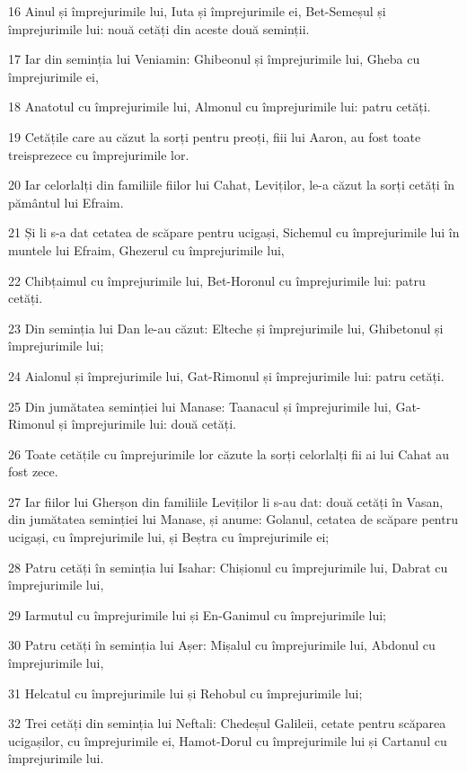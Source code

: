 \par 16 Ainul și împrejurimile lui, Iuta și împrejurimile ei, Bet-Semeșul și împrejurimile lui: nouă cetăți din aceste două seminții.
\par 17 Iar din seminția lui Veniamin: Ghibeonul și împrejurimile lui, Gheba cu împrejurimile ei,
\par 18 Anatotul cu împrejurimile lui, Almonul cu împrejurimile lui: patru cetăți.
\par 19 Cetățile care au căzut la sorți pentru preoți, fiii lui Aaron, au fost toate treisprezece cu împrejurimile lor.
\par 20 Iar celorlalți din familiile fiilor lui Cahat, Leviților, le-a căzut la sorți cetăți în pământul lui Efraim.
\par 21 Și li s-a dat cetatea de scăpare pentru ucigași, Sichemul cu împrejurimile lui în muntele lui Efraim, Ghezerul cu împrejurimile lui,
\par 22 Chibțaimul cu împrejurimile lui, Bet-Horonul cu împrejurimile lui: patru cetăți.
\par 23 Din seminția lui Dan le-au căzut: Elteche și împrejurimile lui, Ghibetonul și împrejurimile lui;
\par 24 Aialonul și împrejurimile lui, Gat-Rimonul și împrejurimile lui: patru cetăți.
\par 25 Din jumătatea seminției lui Manase: Taanacul și împrejurimile lui, Gat-Rimonul și împrejurimile lui: două cetăți.
\par 26 Toate cetățile cu împrejurimile lor căzute la sorți celorlalți fii ai lui Cahat au fost zece.
\par 27 Iar fiilor lui Gherșon din familiile Leviților li s-au dat: două cetăți în Vasan, din jumătatea seminției lui Manase, și anume: Golanul, cetatea de scăpare pentru ucigași, cu împrejurimile lui, și Beștra cu împrejurimile ei;
\par 28 Patru cetăți în seminția lui Isahar: Chișionul cu împrejurimile lui, Dabrat cu împrejurimile lui,
\par 29 Iarmutul cu împrejurimile lui și En-Ganimul cu împrejurimile lui;
\par 30 Patru cetăți în seminția lui Așer: Mișalul cu împrejurimile lui, Abdonul cu împrejurimile lui,
\par 31 Helcatul cu împrejurimile lui și Rehobul cu împrejurimile lui;
\par 32 Trei cetăți din seminția lui Neftali: Chedeșul Galileii, cetate pentru scăparea ucigașilor, cu împrejurimile ei, Hamot-Dorul cu împrejurimile lui și Cartanul cu împrejurimile lui.
